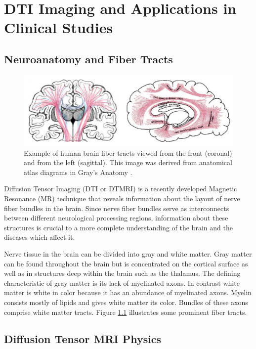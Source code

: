\chapter{DTI Imaging and Applications in Clinical Studies}

\section{Neuroanatomy and Fiber Tracts}
\begin{figure} \label{fig:fibertracts}
	\includegraphics[width=\linewidth]{graysfibertracts}
	\caption{Example of human brain fiber tracts viewed from the front (coronal) and from the left (sagittal).  This image was derived from anatomical atlas diagrams in Gray's Anatomy \cite{odonnel06}.}
\end{figure}

Diffusion Tensor Imaging (DTI or DTMRI) is a recently developed Magnetic Resonance (MR) technique that reveals information about the layout of nerve fiber bundles in the brain.  Since nerve fiber bundles serve as interconnects between different neurological processing regions, information about these structures is crucial to a more complete understanding of the brain and the diseases which affect it.

Nerve tissue in the brain can be divided into gray and white matter.  Gray matter can be found throughout the brain but is concentrated on the cortical surface as well as in structures deep within the brain such as the thalamus.  The defining characteristic of gray matter is its lack of myelinated axons.  In contrast white matter is white in color because it has an abundance of myelinated axons.  Myelin consists mostly of lipids and gives white matter its color.  Bundles of these axons comprise white matter tracts. Figure \ref{fig:fibertracts} illustrates some prominent fiber tracts.

\section{Diffusion Tensor MRI Physics}

